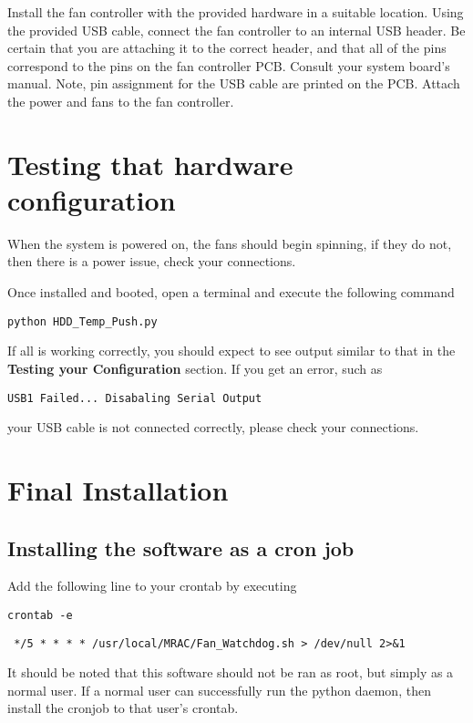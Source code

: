 \documentclass[10pt,letterpaper]{report}
\begin{document}
Install the fan controller with the provided hardware in a suitable location. Using the provided USB cable, connect the fan controller to an internal USB header. Be certain that you are attaching it to the correct header, and that all of the pins correspond to the pins on the fan controller PCB. Consult your system board's manual. Note, pin assignment for the USB cable are printed on the PCB. Attach the power and fans to the fan controller.

\section{Testing that hardware configuration}

When the system is powered on, the fans should begin spinning, if they do not, then there is a power issue, check your connections.

Once installed and booted, open a terminal and execute the following command
%
\begin{verbatim}
python HDD_Temp_Push.py
\end{verbatim}
%
If all is working correctly, you should expect to see output similar to that in the \textbf{Testing your Configuration} section. If you get an error, such as
%
\begin{verbatim}
USB1 Failed... Disabaling Serial Output
\end{verbatim}
%
your USB cable is not connected correctly, please check your connections.

\section{Final Installation}

\subsection{Installing the software as a cron job}

Add the following line to your crontab by executing 

\begin{verbatim}
crontab -e
\end{verbatim}

\begin{verbatim}
 */5 * * * * /usr/local/MRAC/Fan_Watchdog.sh > /dev/null 2>&1
\end{verbatim}

It should be noted that this software should not be ran as root, but simply as a normal user. If a normal user can successfully run the python daemon, then install the cronjob to that user's crontab.
\end{document}
